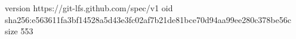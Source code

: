 version https://git-lfs.github.com/spec/v1
oid sha256:e563611fa3bf14528a5d43e3fc02af7b21de81bce70d94aa99ee280c378be56c
size 553
